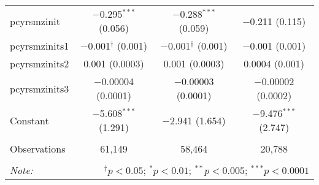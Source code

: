 \begin{table}[!htbp]
\begin{tabular}{@{\extracolsep{5pt}}lccc}
  pcyrsmzinit & $-$0.295$^{***}$ (0.056) & $-$0.288$^{***}$ (0.059) & $-$0.211 (0.115) \\ 
  pcyrsmzinits1 & $-$0.001$^{\dagger}$ (0.001) & $-$0.001$^{\dagger}$ (0.001) & $-$0.001 (0.001) \\ 
  pcyrsmzinits2 & 0.001 (0.0003) & 0.001 (0.0003) & 0.0004 (0.001) \\ 
  pcyrsmzinits3 & $-$0.00004 (0.0001) & $-$0.00003 (0.0001) & $-$0.00002 (0.0002) \\ 
  Constant & $-$5.608$^{***}$ (1.291) & $-$2.941 (1.654) & $-$9.476$^{***}$ (2.747) \\ 
 \hline \\[-1.8ex] 
Observations & 61,149 & 58,464 & 20,788 \\ 
\hline 
\hline \\[-1.8ex] 
\textit{Note:}  & \multicolumn{3}{r}{$^{\dagger} p<0.05$; $^{*} p<0.01$; $^{**} p<0.005$; $^{***} p<0.0001$} \\ 
\end{tabular} 
\end{table} 
